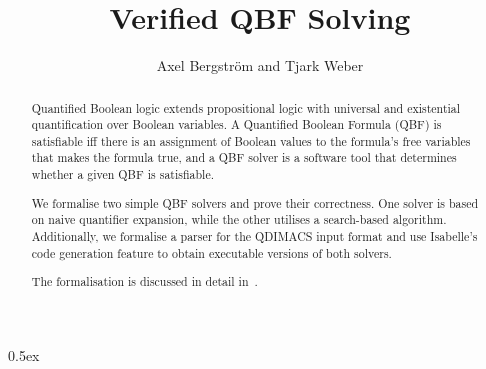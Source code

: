 \documentclass[11pt,a4paper]{article}
\begin{document}
\title{Verified QBF Solving}
\author{Axel Bergström and Tjark Weber}

\maketitle

\begin{abstract}
  Quantified Boolean logic extends propositional logic with universal
  and existential quantification over Boolean variables.  A Quantified
  Boolean Formula (QBF) is satisfiable iff there is an assignment of
  Boolean values to the formula's free variables that makes the
  formula true, and a QBF solver is a software tool that determines
  whether a given QBF is satisfiable.

  We formalise two simple QBF solvers and prove their correctness.
  One solver is based on naive quantifier expansion, while the other
  utilises a search-based algorithm.  Additionally, we formalise a
  parser for the QDIMACS input format and use Isabelle's code
  generation feature to obtain executable versions of both solvers.

  The formalisation is discussed in detail in~\cite{bergstrom24}.
\end{abstract}

\tableofcontents

\parindent 0pt\parskip 0.5ex





\end{document}
